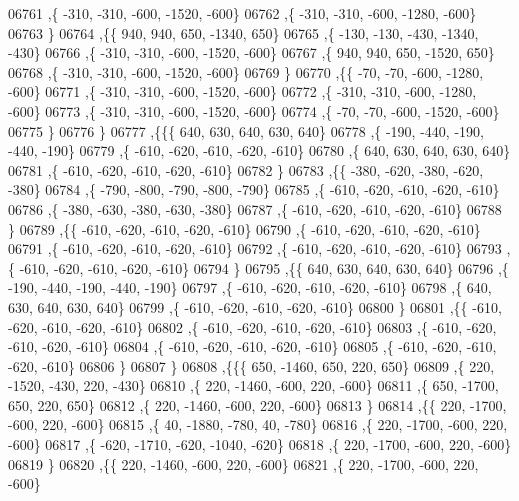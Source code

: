 \begin{DoxyCode}
06761     ,\{  -310,  -310,  -600, -1520,  -600\}
06762     ,\{  -310,  -310,  -600, -1280,  -600\}
06763     \}
06764    ,\{\{   940,   940,   650, -1340,   650\}
06765     ,\{  -130,  -130,  -430, -1340,  -430\}
06766     ,\{  -310,  -310,  -600, -1520,  -600\}
06767     ,\{   940,   940,   650, -1520,   650\}
06768     ,\{  -310,  -310,  -600, -1520,  -600\}
06769     \}
06770    ,\{\{   -70,   -70,  -600, -1280,  -600\}
06771     ,\{  -310,  -310,  -600, -1520,  -600\}
06772     ,\{  -310,  -310,  -600, -1280,  -600\}
06773     ,\{  -310,  -310,  -600, -1520,  -600\}
06774     ,\{   -70,   -70,  -600, -1520,  -600\}
06775     \}
06776    \}
06777   ,\{\{\{   640,   630,   640,   630,   640\}
06778     ,\{  -190,  -440,  -190,  -440,  -190\}
06779     ,\{  -610,  -620,  -610,  -620,  -610\}
06780     ,\{   640,   630,   640,   630,   640\}
06781     ,\{  -610,  -620,  -610,  -620,  -610\}
06782     \}
06783    ,\{\{  -380,  -620,  -380,  -620,  -380\}
06784     ,\{  -790,  -800,  -790,  -800,  -790\}
06785     ,\{  -610,  -620,  -610,  -620,  -610\}
06786     ,\{  -380,  -630,  -380,  -630,  -380\}
06787     ,\{  -610,  -620,  -610,  -620,  -610\}
06788     \}
06789    ,\{\{  -610,  -620,  -610,  -620,  -610\}
06790     ,\{  -610,  -620,  -610,  -620,  -610\}
06791     ,\{  -610,  -620,  -610,  -620,  -610\}
06792     ,\{  -610,  -620,  -610,  -620,  -610\}
06793     ,\{  -610,  -620,  -610,  -620,  -610\}
06794     \}
06795    ,\{\{   640,   630,   640,   630,   640\}
06796     ,\{  -190,  -440,  -190,  -440,  -190\}
06797     ,\{  -610,  -620,  -610,  -620,  -610\}
06798     ,\{   640,   630,   640,   630,   640\}
06799     ,\{  -610,  -620,  -610,  -620,  -610\}
06800     \}
06801    ,\{\{  -610,  -620,  -610,  -620,  -610\}
06802     ,\{  -610,  -620,  -610,  -620,  -610\}
06803     ,\{  -610,  -620,  -610,  -620,  -610\}
06804     ,\{  -610,  -620,  -610,  -620,  -610\}
06805     ,\{  -610,  -620,  -610,  -620,  -610\}
06806     \}
06807    \}
06808   ,\{\{\{   650, -1460,   650,   220,   650\}
06809     ,\{   220, -1520,  -430,   220,  -430\}
06810     ,\{   220, -1460,  -600,   220,  -600\}
06811     ,\{   650, -1700,   650,   220,   650\}
06812     ,\{   220, -1460,  -600,   220,  -600\}
06813     \}
06814    ,\{\{   220, -1700,  -600,   220,  -600\}
06815     ,\{    40, -1880,  -780,    40,  -780\}
06816     ,\{   220, -1700,  -600,   220,  -600\}
06817     ,\{  -620, -1710,  -620, -1040,  -620\}
06818     ,\{   220, -1700,  -600,   220,  -600\}
06819     \}
06820    ,\{\{   220, -1460,  -600,   220,  -600\}
06821     ,\{   220, -1700,  -600,   220,  -600\}

\end{DoxyCode}
